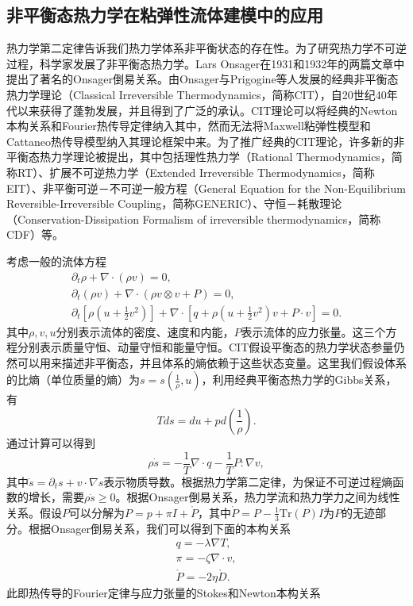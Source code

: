 \subsection{非平衡态热力学在粘弹性流体建模中的应用}
热力学第二定律告诉我们热力学体系非平衡状态的存在性。为了研究热力学不可逆过程，科学家发展了非平衡态热力学。Lars Onsager在1931和1932年的两篇文章中提出了著名的Onsager倒易关系\cite{onsager1931reciprocal,onsager1931reciprocalII}。由Onsager与Prigogine等人发展的经典非平衡态热力学理论（Classical Irreversible Thermodynamics，简称CIT），自20世纪40年代以来获得了蓬勃发展，并且得到了广泛的承认\cite{jou1996extended,truesdell2012rational}。CIT理论可以将经典的Newton本构关系和Fourier热传导定律纳入其中，然而无法将Maxwell粘弹性模型和Cattaneo热传导模型纳入其理论框架中来。为了推广经典的CIT理论，许多新的非平衡态热力学理论被提出，其中包括理性热力学（Rational Thermodynamics，简称RT）、扩展不可逆热力学（Extended Irreversible Thermodynamics，简称EIT）、非平衡可逆－不可逆一般方程（General Equation for the Non-Equilibrium Reversible-Irreversible Coupling，简称GENERIC）、守恒－耗散理论（Conservation-Dissipation Formalism of irreversible thermodynamics，简称CDF）等\cite{truesdell2012rational,jou1996extended,ottinger2005beyond,zhu2014conservation}。

考虑一般的流体方程
\begin{subequations} \label{eq:fluid}
	\begin{align}
		\partial_t \rho + \nabla \cdot (\rho v) = 0 ,\\
		\partial_t (\rho v) + \nabla \cdot (\rho v \otimes v + P) =  0, \\
		\partial_t[\rho (u + \frac{1}{2} v^2)] + \nabla \cdot [q + \rho (u+\frac{1}{2}v^2) v + P \cdot v] = 0.
	\end{align}
\end{subequations}
其中$\rho,v,u$分别表示流体的密度、速度和内能，$P$表示流体的应力张量。这三个方程分别表示质量守恒、动量守恒和能量守恒。CIT假设平衡态的热力学状态参量仍然可以用来描述非平衡态，并且体系的熵依赖于这些状态变量。这里我们假设体系的比熵（单位质量的熵）为$s=s(\frac{1}{\rho},u)$，利用经典平衡态热力学的Gibbs关系，有
\begin{equation*}
	T ds = du + p d(\frac{1}{\rho}).
\end{equation*}
通过计算可以得到
\begin{equation*}
	\rho \dot{s} = - \frac{1}{T} \nabla \cdot q - \frac{1}{T} P: \nabla v,
\end{equation*}
其中$\dot{s} = \partial_t s + v \cdot \nabla s$表示物质导数。根据热力学第二定律，为保证不可逆过程熵函数的增长，需要$\rho \dot{s} \ge 0 $。根据Onsager倒易关系，热力学流和热力学力之间为线性关系。假设$P$可以分解为$P = p + \pi I + \mathring{P}$，其中$\mathring{P} = P - \frac{1}{3} \mbox{Tr}(P) I$为$P$的无迹部分。根据Onsager倒易关系，我们可以得到下面的本构关系
\begin{eqnarray*}
	q = -\lambda \nabla T, \\
	\pi =  - \zeta \nabla \cdot v, \\
	\mathring{P} = - 2 \eta \mathring{D}.
\end{eqnarray*}
此即热传导的Fourier定律与应力张量的Stokes和Newton本构关系

